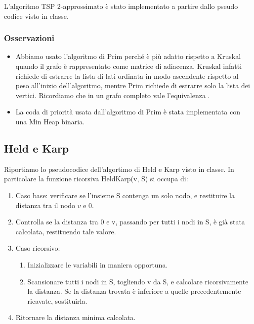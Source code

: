 \noindent L'algoritmo TSP 2-approssimato è stato implementato a partire dallo pseudo codice visto in classe. \\

\subsubsection{Osservazioni}

\begin{itemize}
    \item Abbiamo usato l'algoritmo di Prim perché è più adatto rispetto a Kruskal quando il grafo è rappresentato come matrice di adiacenza. Kruskal infatti richiede di estrarre la lista di lati ordinata in modo ascendente rispetto al peso all'inizio dell'algoritmo, mentre Prim richiede di estrarre solo la lista dei vertici. Ricordiamo che in un grafo completo vale l'equivalenza \complexityCompleteGraph{}.
    
    \item La coda di priorità usata dall'algoritmo di Prim è stata implementata con una Min Heap binaria.
\end{itemize}

\subsection{Held e Karp}

Riportiamo lo pseudocodice dell'algortimo di Held e Karp visto in classe. In particolare la funzione ricorsiva HeldKarp(v, S) si occupa di:

\begin{enumerate}
    \item Caso base: verificare se l'insieme S contenga un solo nodo, e restituire la distanza tra il nodo $v$ e 0.
    \item Controlla se la distanza tra 0 e v, passando per tutti i nodi in S, è già stata calcolata, restituendo tale valore.
    \item Caso ricorsivo:
    \begin{enumerate}
        \item Inizializzare le variabili in maniera opportuna.
        \item Scansionare tutti i nodi in S, togliendo v da S, e calcolare ricorsivamente la distanza. Se la distanza trovata è inferiore a quelle precedentemente ricavate, sostituirla.
    \end{enumerate}
    \item Ritornare la distanza minima calcolata.
\end{enumerate}


